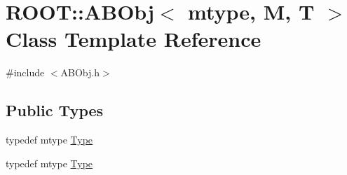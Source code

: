 \hypertarget{classROOT_1_1Minuit2_1_1ABObj}{}\section{R\+O\+OT\+:\+:A\+B\+Obj$<$ mtype, M, T $>$ Class Template Reference}
\label{classROOT_1_1Minuit2_1_1ABObj}


{\ttfamily \#include $<$A\+B\+Obj.\+h$>$}

\subsection*{Public Types}
\begin{DoxyCompactItemize}
\item 
typedef mtype \mbox{\hyperlink{classROOT_1_1Minuit2_1_1ABObj_aaa1bd50c134682a0713ce549f31e85ab}{Type}}
\item 
typedef mtype \mbox{\hyperlink{classROOT_1_1Minuit2_1_1ABObj_aaa1bd50c134682a0713ce549f31e85ab}{Type}}
\end{DoxyCompactItemize}
